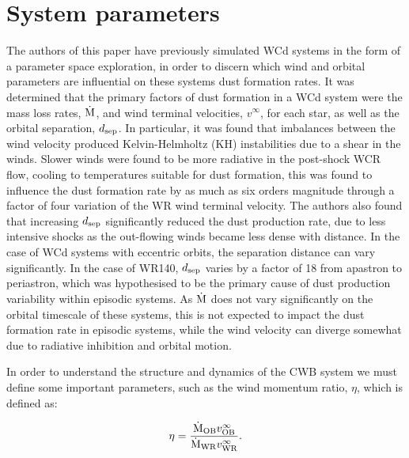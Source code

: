 \section{System parameters}
\label{sec:paper2-wr140}

The authors of this paper have previously simulated WCd systems in the form of a parameter space exploration, in order to discern which wind and orbital parameters are influential on these systems dust formation rates.
It was determined that the primary factors of dust formation in a WCd system were the mass loss rates, $\dot{\text{M}}$, and wind terminal velocities, $v^\infty$, for each star, as well as the orbital separation, $d_\text{sep}$.
In particular, it was found that imbalances between the wind velocity produced Kelvin-Helmholtz (KH) instabilities due to a shear in the winds.
Slower winds were found to be more radiative in the post-shock WCR flow, cooling to temperatures suitable for dust formation, this was found to influence the dust formation rate by as much as six orders magnitude through a factor of four variation of the WR wind terminal velocity.
The authors also found that increasing $d_\text{sep}$ significantly reduced the dust production rate, due to less intensive shocks as the out-flowing winds became less dense with distance.
In the case of WCd systems with eccentric orbits, the separation distance can vary significantly.
In the case of WR140, $d_\text{sep}$ varies by a factor of 18 from apastron to periastron, which was hypothesised to be the primary cause of dust production variability within episodic systems.
As $\dot{\text{M}}$ does not vary significantly on the orbital timescale of these systems, this is not expected to impact the dust formation rate in episodic systems, while the wind velocity can diverge somewhat due to radiative inhibition and orbital motion.

In order to understand the structure and dynamics of the CWB system we must define some important parameters, such as the wind momentum ratio, $\eta$, which is defined as:

\begin{equation}
  \eta = \frac{\dot{\text{M}}_{\text{OB}} v^\infty_{\text{OB}}}{\dot{\text{M}}_{\text{WR}} v^\infty_{\text{WR}}} .
\end{equation}

